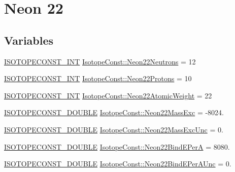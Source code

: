 \hypertarget{group___isotope_const-_neon-_ne22}{}\section{Neon 22}
\label{group___isotope_const-_neon-_ne22}
\subsection*{Variables}
\begin{DoxyCompactItemize}
\item 
\mbox{\hyperlink{group___isotope_const-_macros_ga5f18360b3e99483a35c32d789e62621c}{I\+S\+O\+T\+O\+P\+E\+C\+O\+N\+S\+T\+\_\+\+I\+NT}} \mbox{\hyperlink{group___isotope_const-_neon-_ne22_gae94c1d5c8656f7c2b9c4374ad8161a4c}{Isotope\+Const\+::\+Neon22\+Neutrons}} = 12
\item 
\mbox{\hyperlink{group___isotope_const-_macros_ga5f18360b3e99483a35c32d789e62621c}{I\+S\+O\+T\+O\+P\+E\+C\+O\+N\+S\+T\+\_\+\+I\+NT}} \mbox{\hyperlink{group___isotope_const-_neon-_ne22_gafca29d9490e23b02346f62fdc1605b1d}{Isotope\+Const\+::\+Neon22\+Protons}} = 10
\item 
\mbox{\hyperlink{group___isotope_const-_macros_ga5f18360b3e99483a35c32d789e62621c}{I\+S\+O\+T\+O\+P\+E\+C\+O\+N\+S\+T\+\_\+\+I\+NT}} \mbox{\hyperlink{group___isotope_const-_neon-_ne22_gac6187de1bc99eb0768e5681f8fc05b1c}{Isotope\+Const\+::\+Neon22\+Atomic\+Weight}} = 22
\item 
\mbox{\hyperlink{group___isotope_const-_macros_ga8f45a7272ce02c0b4c65c44636ed719a}{I\+S\+O\+T\+O\+P\+E\+C\+O\+N\+S\+T\+\_\+\+D\+O\+U\+B\+LE}} \mbox{\hyperlink{group___isotope_const-_neon-_ne22_gada98c88d10fdc0ddb867889c8f20c3d3}{Isotope\+Const\+::\+Neon22\+Mass\+Exc}} = -\/8024.
\item 
\mbox{\hyperlink{group___isotope_const-_macros_ga8f45a7272ce02c0b4c65c44636ed719a}{I\+S\+O\+T\+O\+P\+E\+C\+O\+N\+S\+T\+\_\+\+D\+O\+U\+B\+LE}} \mbox{\hyperlink{group___isotope_const-_neon-_ne22_gaedf700c26d150aece31e50f68e93d60a}{Isotope\+Const\+::\+Neon22\+Mass\+Exc\+Unc}} = 0.
\item 
\mbox{\hyperlink{group___isotope_const-_macros_ga8f45a7272ce02c0b4c65c44636ed719a}{I\+S\+O\+T\+O\+P\+E\+C\+O\+N\+S\+T\+\_\+\+D\+O\+U\+B\+LE}} \mbox{\hyperlink{group___isotope_const-_neon-_ne22_ga9c865f40cf54731a1d63c52ff8924735}{Isotope\+Const\+::\+Neon22\+Bind\+E\+PerA}} = 8080.
\item 
\mbox{\hyperlink{group___isotope_const-_macros_ga8f45a7272ce02c0b4c65c44636ed719a}{I\+S\+O\+T\+O\+P\+E\+C\+O\+N\+S\+T\+\_\+\+D\+O\+U\+B\+LE}} \mbox{\hyperlink{group___isotope_const-_neon-_ne22_ga214063984ea6b6c23e0ade344c10a933}{Isotope\+Const\+::\+Neon22\+Bind\+E\+Per\+A\+Unc}} = 0.

\end{DoxyCompactItemize}
